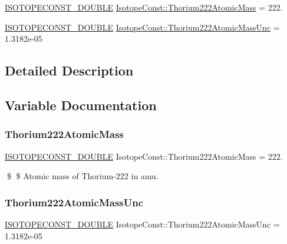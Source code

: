 \begin{DoxyCompactItemize}
\item 
\mbox{\hyperlink{group___isotope_const-_macros_ga8f45a7272ce02c0b4c65c44636ed719a}{I\+S\+O\+T\+O\+P\+E\+C\+O\+N\+S\+T\+\_\+\+D\+O\+U\+B\+LE}} \mbox{\hyperlink{group___isotope_const-_thorium-_th222_gaff1d5a8d9e9204da0595cc426efb10dc}{Isotope\+Const\+::\+Thorium222\+Atomic\+Mass}} = 222.
\item 
\mbox{\hyperlink{group___isotope_const-_macros_ga8f45a7272ce02c0b4c65c44636ed719a}{I\+S\+O\+T\+O\+P\+E\+C\+O\+N\+S\+T\+\_\+\+D\+O\+U\+B\+LE}} \mbox{\hyperlink{group___isotope_const-_thorium-_th222_ga193467e3bd3c289b80bddce45dcccbc3}{Isotope\+Const\+::\+Thorium222\+Atomic\+Mass\+Unc}} = 1.\+3182e-\/05
\end{DoxyCompactItemize}


\subsection{Detailed Description}


\subsection{Variable Documentation}
\mbox{\label{group___isotope_const-_thorium-_th222_gaff1d5a8d9e9204da0595cc426efb10dc}} 
\subsubsection{\texorpdfstring{Thorium222\+Atomic\+Mass}{Thorium222AtomicMass}}
{\footnotesize\ttfamily \mbox{\hyperlink{group___isotope_const-_macros_ga8f45a7272ce02c0b4c65c44636ed719a}{I\+S\+O\+T\+O\+P\+E\+C\+O\+N\+S\+T\+\_\+\+D\+O\+U\+B\+LE}} Isotope\+Const\+::\+Thorium222\+Atomic\+Mass = 222.}

\$ \$ Atomic mass of Thorium-\/222 in amu. \mbox{\label{group___isotope_const-_thorium-_th222_ga193467e3bd3c289b80bddce45dcccbc3}} 
\subsubsection{\texorpdfstring{Thorium222\+Atomic\+Mass\+Unc}{Thorium222AtomicMassUnc}}
{\footnotesize\ttfamily \mbox{\hyperlink{group___isotope_const-_macros_ga8f45a7272ce02c0b4c65c44636ed719a}{I\+S\+O\+T\+O\+P\+E\+C\+O\+N\+S\+T\+\_\+\+D\+O\+U\+B\+LE}} Isotope\+Const\+::\+Thorium222\+Atomic\+Mass\+Unc = 1.\+3182e-\/05}

